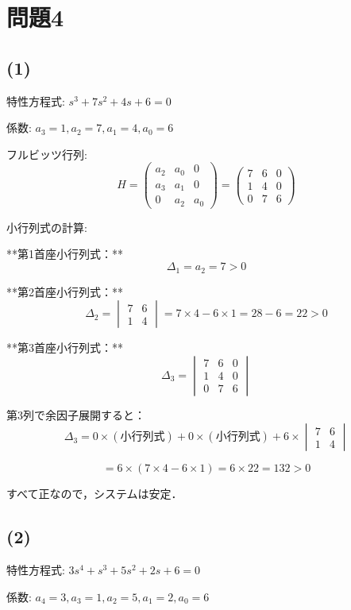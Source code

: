 \documentclass[11pt,a4paper]{ltjsarticle}
\begin{document}
\section{問題4}

\subsection{(1)}
特性方程式: $s^3+7s^2+4s+6=0$

係数: $a_3=1, a_2=7, a_1=4, a_0=6$

フルビッツ行列:
$$H = \begin{pmatrix} a_2 & a_0 & 0 \\ a_3 & a_1 & 0 \\ 0 & a_2 & a_0 \end{pmatrix} = \begin{pmatrix} 7 & 6 & 0 \\ 1 & 4 & 0 \\ 0 & 7 & 6 \end{pmatrix}$$

小行列式の計算:

**第1首座小行列式：**
$$\Delta_1 = a_2 = 7 > 0$$

**第2首座小行列式：**
$$\Delta_2 = \begin{vmatrix} 7 & 6 \\ 1 & 4 \end{vmatrix} = 7 \times 4 - 6 \times 1 = 28 - 6 = 22 > 0$$

**第3首座小行列式：**
$$\Delta_3 = \begin{vmatrix} 7 & 6 & 0 \\ 1 & 4 & 0 \\ 0 & 7 & 6 \end{vmatrix}$$

第3列で余因子展開すると：
$$\Delta_3 = 0 \times (\text{小行列式}) + 0 \times (\text{小行列式}) + 6 \times \begin{vmatrix} 7 & 6 \\ 1 & 4 \end{vmatrix}$$

$$= 6 \times (7 \times 4 - 6 \times 1) = 6 \times 22 = 132 > 0$$

すべて正なので，システムは安定．

\subsection{(2)}
特性方程式: $3s^4+s^3+5s^2+2s+6=0$

係数: $a_4=3, a_3=1, a_2=5, a_1=2, a_0=6$
\end{document}
